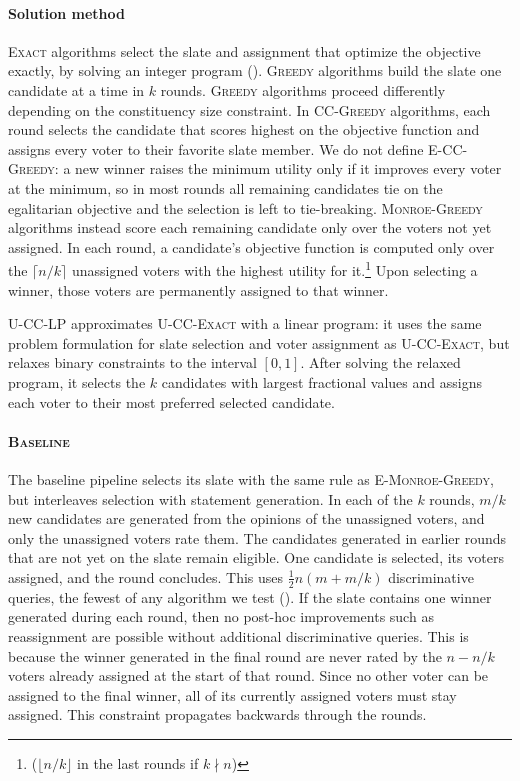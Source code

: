 \documentclass[letterpaper]{article} %
\newcommand{\Exact}{\textsc{U-CC-Exact}}
\newcommand{\LP}{\textsc{U-CC-LP}}
\newcommand{\Baseline}{\textsc{Baseline}}
\newcommand{\GreedyMonroe}{\textsc{E-Monroe-Greedy}}
\begin{document}
\paragraph{Solution method}
\textsc{Exact} algorithms select the slate and assignment that optimize the objective exactly, by solving an integer program ().
\textsc{Greedy} algorithms build the slate one candidate at a time in \(k\) rounds.
\textsc{Greedy} algorithms proceed differently depending on the constituency size constraint.
In \textsc{CC-Greedy} algorithms, each round selects the candidate that scores highest on the objective function and assigns every voter to their favorite slate member.
We do not define \textsc{E-CC-Greedy}: a new winner raises the minimum utility only if it improves every voter at the minimum, so in most rounds all remaining candidates tie on the egalitarian objective and the selection is left to tie-breaking.
\textsc{Monroe-Greedy} algorithms instead score each remaining candidate only over the voters not yet assigned.
In each round, a candidate's objective function is computed only over the \(\lceil n/k\rceil\) unassigned voters with the highest utility for it.\footnote{(\(\lfloor n/k\rfloor\) in the last rounds if \(k \nmid n\))}
Upon selecting a winner, those voters are permanently assigned to that winner.

\LP{} approximates \Exact{} with a linear program: it uses the same problem formulation for slate selection and voter assignment as \Exact{}, %
but relaxes binary constraints to the interval \([0,1]\).
After solving the relaxed program, it selects the \(k\) candidates with largest fractional values and assigns each voter to their most preferred selected candidate.

\paragraph{\Baseline{} \citep{fish-v2}}
The baseline pipeline selects its slate with the same rule as \GreedyMonroe{}, but interleaves selection with statement generation.
In each of the \(k\) rounds, \(m/k\) new candidates are generated from the opinions of the unassigned voters, and only the unassigned voters rate them.
The candidates generated in earlier rounds that are not yet on the slate remain eligible.
One candidate is selected, its voters assigned, and the round concludes.
This uses \(\frac{1}{2} n (m + m/k)\) discriminative queries, the fewest of any algorithm we test ().
If the slate contains one winner generated during each round, then no post-hoc improvements such as reassignment are possible without additional discriminative queries.
This is because the winner generated in the final round are never rated by the \(n-n/k\) voters already assigned at the start of that round.
Since no other voter can be assigned to the final winner, all of its currently assigned voters must stay assigned.
This constraint propagates backwards through the rounds.
\end{document}
